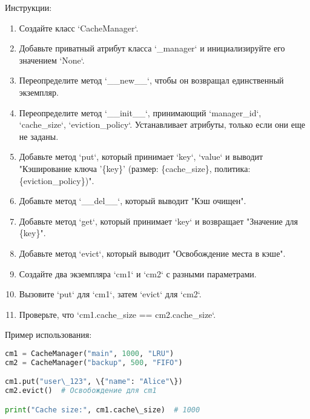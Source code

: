\begin{enumerate}
Инструкции:
\begin{enumerate}
    \item Создайте класс `CacheManager`.
    \item Добавьте приватный атрибут класса `\_manager` и инициализируйте его значением `None`.
    \item Переопределите метод `\_\_new\_\_`, чтобы он возвращал единственный экземпляр.
    \item Переопределите метод `\_\_init\_\_`, принимающий `manager\_id`, `cache\_size`, `eviction\_policy`. Устанавливает атрибуты, только если они еще не заданы.
    \item Добавьте метод `put`, который принимает `key`, `value` и выводит "Кэширование ключа '\{key\}' (размер: \{cache\_size\}, политика: \{eviction\_policy\})".
    \item Добавьте метод `\_\_del\_\_`, который выводит "Кэш очищен".
    \item Добавьте метод `get`, который принимает `key` и возвращает "Значение для \{key\}".
    \item Добавьте метод `evict`, который выводит "Освобождение места в кэше".
    \item Создайте два экземпляра `cm1` и `cm2` с разными параметрами.
    \item Вызовите `put` для `cm1`, затем `evict` для `cm2`.
    \item Проверьте, что `cm1.cache\_size == cm2.cache\_size`.
\end{enumerate}

Пример использования:
\begin{lstlisting}[language=Python]
cm1 = CacheManager("main", 1000, "LRU")
cm2 = CacheManager("backup", 500, "FIFO")

cm1.put("user\_123", \{"name": "Alice"\})
cm2.evict()  # Освобождение для cm1

print("Cache size:", cm1.cache\_size)  # 1000
\end{lstlisting}

\end{enumerate}